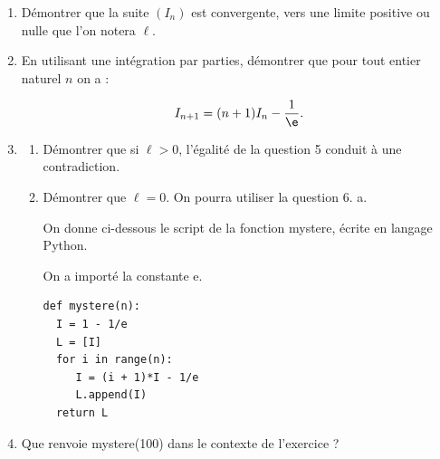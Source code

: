 \begin{enumerate}
\begin{enumerate}
\[0 \leqslant x^{n+1} \leqslant x^n.\]

		\item En déduire que pour tout entier naturel $n$, on a :

\[0 \leqslant I_{n+1} \leqslant I_n.\]
	\end{enumerate}
\item Démontrer que la suite $(I_n)$ est convergente, vers une limite positive ou nulle que l'on notera $\ell$.
\item En utilisant une intégration par parties, démontrer que pour tout entier naturel $n$ on a :

\[I_{n+1} = (n + 1)I_n - \dfrac{1}{\e}.\]
\item
	\begin{enumerate}
		\item Démontrer que si $\ell > 0$, l'égalité de la question 5 conduit à une contradiction.
		\item Démontrer que $\ell = 0$. On pourra utiliser la question 6. a.

\medskip

On donne ci-dessous le script de la fonction mystere, écrite en langage Python.

On a importé la constante e.

\begin{center}
\begin{Verbatim}[frame=single]
def mystere(n):
  I = 1 - 1/e
  L = [I]
  for i in range(n):
     I = (i + 1)*I - 1/e
     L.append(I) 
  return L
\end{Verbatim}
\end{center}
	\end{enumerate}
\item Que renvoie mystere(100) dans le contexte de l'exercice ?

\end{enumerate}

\bigskip
